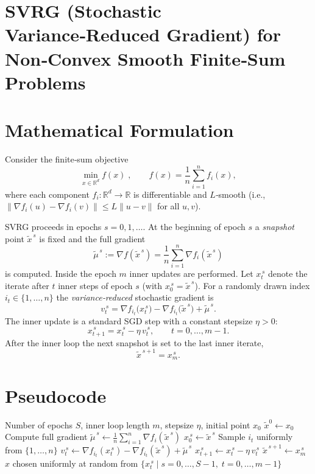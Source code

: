 \documentclass{article}
\newcommand{\grad}{\nabla}
\begin{document}
\section*{SVRG (Stochastic Variance‑Reduced Gradient) for Non‑Convex Smooth Finite‑Sum Problems}

\section*{Mathematical Formulation}
Consider the finite‑sum objective
\[
\min_{x\in\mathbb{R}^d} f(x)\;,\qquad 
f(x)=\frac{1}{n}\sum_{i=1}^{n} f_i(x),
\]
where each component $f_i:\mathbb{R}^d\rightarrow\mathbb{R}$ is differentiable and $L$‑smooth (i.e., $\|\grad f_i(u)-\grad f_i(v)\|\le L\|u-v\|$ for all $u,v$).

SVRG proceeds in epochs $s=0,1,\dots$. At the beginning of epoch $s$ a \emph{snapshot} point $\tilde{x}^{\,s}$ is fixed and the full gradient
\[
\tilde{\mu}^{\,s}:=\grad f(\tilde{x}^{\,s})=\frac{1}{n}\sum_{i=1}^{n}\grad f_i(\tilde{x}^{\,s})
\]
is computed.  
Inside the epoch $m$ inner updates are performed. Let $x_{t}^{\,s}$ denote the iterate after $t$ inner steps of epoch $s$ (with $x_{0}^{\,s}=\tilde{x}^{\,s}$). For a randomly drawn index $i_t\in\{1,\dots,n\}$ the \emph{variance‑reduced} stochastic gradient is
\[
v_{t}^{\,s}= \grad f_{i_t}\!\bigl(x_{t}^{\,s}\bigr)-\grad f_{i_t}\!\bigl(\tilde{x}^{\,s}\bigr)+\tilde{\mu}^{\,s}.
\tag{1}
\]
The inner update is a standard SGD step with a constant stepsize $\eta>0$:
\[
x_{t+1}^{\,s}=x_{t}^{\,s}-\eta\, v_{t}^{\,s},\qquad t=0,\dots,m-1.
\tag{2}
\]
After the inner loop the next snapshot is set to the last inner iterate,
\[
\tilde{x}^{\,s+1}=x_{m}^{\,s}.
\tag{3}
\]

\section*{Pseudocode}
\begin{algorithm}[H]
\caption{SVRG for Non‑Convex $L$‑Smooth Finite‑Sum}
\begin{algorithmic}[1]
\Require Number of epochs $S$, inner loop length $m$, stepsize $\eta$, initial point $x_0$
\State $\tilde{x}^{0}\gets x_0$
    \State Compute full gradient $\tilde{\mu}^{\,s}\gets \frac{1}{n}\sum_{i=1}^{n}\grad f_i(\tilde{x}^{\,s})$
    \State $x_{0}^{\,s}\gets \tilde{x}^{\,s}$
        \State Sample $i_t$ uniformly from $\{1,\dots,n\}$
        \State $v_{t}^{\,s}\gets \grad f_{i_t}(x_{t}^{\,s})-\grad f_{i_t}(\tilde{x}^{\,s})+\tilde{\mu}^{\,s}$ 
        \State $x_{t+1}^{\,s}\gets x_{t}^{\,s}-\eta\,v_{t}^{\,s}$
    \EndFor
    \State $\tilde{x}^{\,s+1}\gets x_{m}^{\,s}$
\EndFor
\State \Return $\hat{x}$ chosen uniformly at random from $\{x_{t}^{\,s}\mid s=0,\dots,S-1,\;t=0,\dots,m-1\}$
\end{algorithmic}
\end{algorithm}
\end{document}
